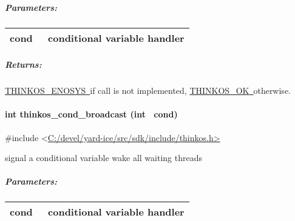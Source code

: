 {{}

\subparagraph{\texorpdfstring{{Parameters:}}{Parameters:}}\label{parameters-17}

\protect\hypertarget{t.5f6a6301995a69995f1253a58a8df876856672ec}{}{}\protect\hypertarget{t.17}{}{}

\begin{longtable}[]{@{}ll@{}}
\toprule
\begin{minipage}[t]{0.47\columnwidth}\raggedright\strut
{cond}{~}\strut
\end{minipage} & \begin{minipage}[t]{0.47\columnwidth}\raggedright\strut
{conditional variable handler }\strut
\end{minipage}\tabularnewline
\bottomrule
\end{longtable}

\subparagraph{\texorpdfstring{{Returns:}}{Returns:}}\label{returns-21}

{\protect\hyperlink{h.3s49zyc}{THINKOS\_ENOSYS}}{\protect\hyperlink{h.3s49zyc}{~}}{if
call is not implemented,
}{\protect\hyperlink{h.2fk6b3p}{THINKOS\_OK}}{\protect\hyperlink{h.2fk6b3p}{~}}{otherwise.
}

\paragraph{\texorpdfstring{{int thinkos\_cond\_broadcast (int
~cond)}}{int thinkos\_cond\_broadcast (int ~cond)}}\label{int-thinkos_cond_broadcast-int-cond}

{}

{\#include
\textless{}}{\protect\hyperlink{h.pkwqa1}{C:/devel/yard-ice/src/sdk/include/thinkos.h}}{\protect\hyperlink{h.pkwqa1}{\textgreater{}}}

{signal a conditional variable wake all waiting threads }

{}

\subparagraph{\texorpdfstring{{Parameters:}}{Parameters:}}\label{parameters-18}

\protect\hypertarget{t.5f6a6301995a69995f1253a58a8df876856672ec}{}{}\protect\hypertarget{t.18}{}{}

\begin{longtable}[]{@{}ll@{}}
\toprule
\begin{minipage}[t]{0.47\columnwidth}\raggedright\strut
{cond}{~}\strut
\end{minipage} & \begin{minipage}[t]{0.47\columnwidth}\raggedright\strut
{conditional variable handler }\strut
\end{minipage}\tabularnewline
\bottomrule
\end{longtable}

}
